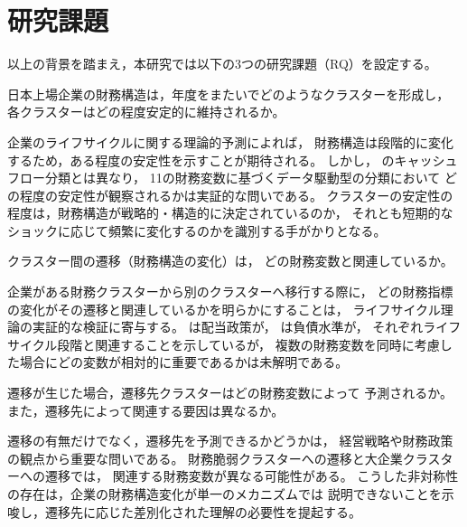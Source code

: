 \section{研究課題}
\label{sec:intro-questions}

以上の背景を踏まえ，本研究では以下の3つの研究課題（RQ）を設定する。

\begin{description}[style=nextline, leftmargin=2em]
  \item[\textbf{RQ1}] 日本上場企業の財務構造は，年度をまたいでどのようなクラスターを形成し，
    各クラスターはどの程度安定的に維持されるか。
\end{description}

企業のライフサイクルに関する理論的予測によれば，
財務構造は段階的に変化するため，ある程度の安定性を示すことが期待される。
しかし， のキャッシュフロー分類とは異なり，
11の財務変数に基づくデータ駆動型の分類において
どの程度の安定性が観察されるかは実証的な問いである。
クラスターの安定性の程度は，財務構造が戦略的・構造的に決定されているのか，
それとも短期的なショックに応じて頻繁に変化するのかを識別する手がかりとなる。

\begin{description}[style=nextline, leftmargin=2em]
  \item[\textbf{RQ2}] クラスター間の遷移（財務構造の変化）は，
    どの財務変数と関連しているか。
\end{description}

企業がある財務クラスターから別のクラスターへ移行する際に，
どの財務指標の変化がその遷移と関連しているかを明らかにすることは，
ライフサイクル理論の実証的な検証に寄与する。
 は配当政策が， は負債水準が，
それぞれライフサイクル段階と関連することを示しているが，
複数の財務変数を同時に考慮した場合にどの変数が相対的に重要であるかは未解明である。

\begin{description}[style=nextline, leftmargin=2em]
  \item[\textbf{RQ3}] 遷移が生じた場合，遷移先クラスターはどの財務変数によって
    予測されるか。また，遷移先によって関連する要因は異なるか。
\end{description}

遷移の有無だけでなく，遷移先を予測できるかどうかは，
経営戦略や財務政策の観点から重要な問いである。
財務脆弱クラスターへの遷移と大企業クラスターへの遷移では，
関連する財務変数が異なる可能性がある。
こうした非対称性の存在は，企業の財務構造変化が単一のメカニズムでは
説明できないことを示唆し，遷移先に応じた差別化された理解の必要性を提起する。


